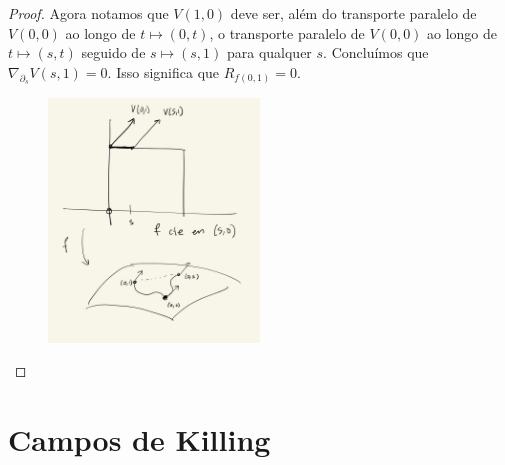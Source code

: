 \begin{proof}
Agora notamos que \(V(1,0)\) deve ser, além do transporte paralelo de \(V(0,0)\) ao longo de \(t \mapsto (0,t)\), o transporte paralelo de \(V(0,0)\) ao longo de \(t \mapsto (s,t)\) seguido de \(s \mapsto (s,1)\) para  qualquer \(s\). Concluímos que \(\nabla_{\partial_s}V(s,1)=0\). Isso significa que \(R_{f(0,1)}=0\).

\begin{figure}[H]
	\centering
	\includegraphics[width=0.5\textwidth]{fig4}
\end{figure}
\end{proof}

\clearpage

\section*{Campos de Killing}

